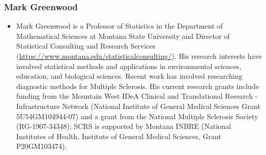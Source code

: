 \documentclass[
]{article}
\providecommand{\tightlist}{%
  \setlength{\itemsep}{0pt}\setlength{\parskip}{0pt}}
\begin{document}
\hypertarget{mark-greenwood}{%
\subsubsection{Mark Greenwood}\label{mark-greenwood}}

\begin{itemize}
\tightlist
\item
  Mark Greenwood is a Professor of Statistics in the Department of
  Mathematical Sciences at Montana State University and Director of
  Statistical Consulting and Research Services
  (\url{https://www.montana.edu/statisticalconsulting/}). His research
  interests have involved statistical methods and applications in
  environmental sciences, education, and biological sciences. Recent
  work has involved researching diagnostic methods for Multiple
  Sclerosis. His current research grants include funding from the
  Mountain West IDeA Clinical and Translational Research -
  Infrastructure Network (National Institute of General Medical Sciences
  Grant 5U54GM104944-07) and a grant from the National Multiple
  Sclerosis Society (RG-1907-34348); SCRS is supported by Montana INBRE
  (National Institutes of Health, Institute of General Medical Sciences,
  Grant P20GM103474).
\end{itemize}
\end{document}
